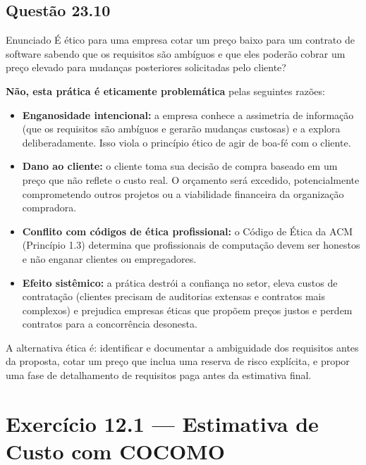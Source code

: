 \documentclass[12pt,a4paper]{article}
\begin{document}
\subsection*{Questão 23.10}
\begin{questao}{Enunciado}
É ético para uma empresa cotar um preço baixo para um contrato de software
sabendo que os requisitos são ambíguos e que eles poderão cobrar um preço
elevado para mudanças posteriores solicitadas pelo cliente?
\end{questao}
\begin{resposta}
\textbf{Não, esta prática é eticamente problemática} pelas seguintes razões:

\begin{itemize}[nosep]
  \item \textbf{Enganosidade intencional:} a empresa conhece a assimetria
        de informação (que os requisitos são ambíguos e gerarão mudanças
        custosas) e a explora deliberadamente. Isso viola o princípio ético
        de agir de boa-fé com o cliente.
  \item \textbf{Dano ao cliente:} o cliente toma sua decisão de compra baseado
        em um preço que não reflete o custo real. O orçamento será excedido,
        potencialmente comprometendo outros projetos ou a viabilidade
        financeira da organização compradora.
  \item \textbf{Conflito com códigos de ética profissional:} o Código de
        Ética da ACM (Princípio 1.3) determina que profissionais de computação
        devem ser honestos e não enganar clientes ou empregadores.
  \item \textbf{Efeito sistêmico:} a prática destrói a confiança no setor,
        eleva custos de contratação (clientes precisam de auditorias extensas
        e contratos mais complexos) e prejudica empresas éticas que propõem
        preços justos e perdem contratos para a concorrência desonesta.
\end{itemize}

A alternativa ética é: identificar e documentar a ambiguidade dos requisitos
antes da proposta, cotar um preço que inclua uma reserva de risco explícita,
e propor uma fase de detalhamento de requisitos paga antes da estimativa final.
\end{resposta}

\section*{Exercício 12.1 — Estimativa de Custo com COCOMO}
\end{document}
